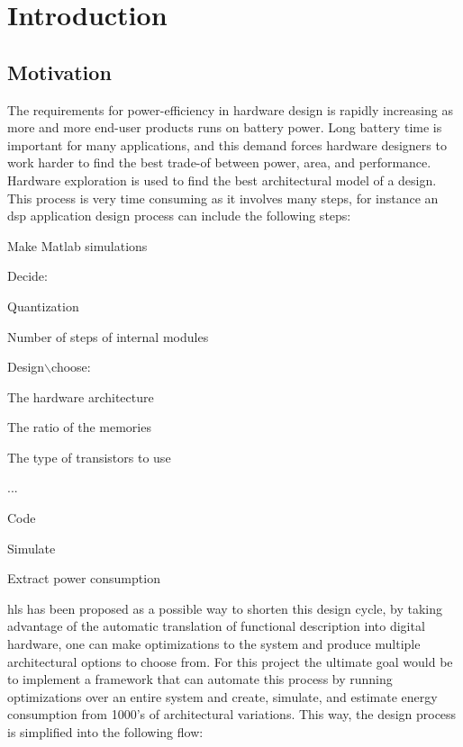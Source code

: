 \chapter{Introduction}
\label{chp:introduction} 
\section{\label{sec:motivation}Motivation}
The requirements for power-efficiency in hardware design is rapidly increasing as more and more end-user products runs on battery power. Long battery time is important for many applications, and this demand forces hardware designers to work harder to find the best trade-of between power, area, and performance. Hardware exploration is used to find the best architectural model of a design. This process is very time consuming as it involves many steps, for instance an \gls{dsp} application design process can include the following steps:
\begin{compactenum}
    \item Make Matlab simulations 
    \item Decide:
    \begin{compactitem}
        \item Quantization
        \item Number of steps of internal modules
    \end{compactitem}
    \item Design$\backslash$choose:
    \begin{compactitem}
        \item The hardware architecture
        \item The ratio of the memories
        \item The type of transistors to use
    \end{compactitem}
    \item ...
    \item Code
    \item Simulate
    \item Extract power consumption
\end{compactenum}
\gls{hls} has been proposed as a possible way to shorten this design cycle, by taking advantage of the automatic translation of functional description into digital hardware, one can make optimizations to the system and produce multiple architectural options to choose from. For this project the ultimate goal would be to implement a framework that can automate this process by running optimizations over an entire system and create, simulate, and estimate energy consumption from 1000’s of architectural variations. This way, the design process is simplified into the following flow:
